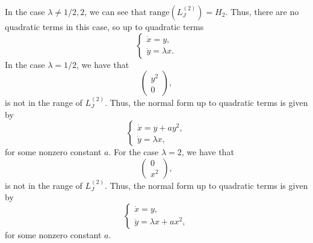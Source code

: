 \documentclass{article}
\begin{document}
In the case $\lambda\neq1/2,2$, we can see that $\text{range}\left(L^{(2)}_J\right)=H_2$. Thus, there are no quadratic terms in this case, so up to quadratic terms
\[
\begin{cases}
	\dot x=y,\\
	\dot y=\lambda x.
\end{cases}
\]
In the case $\lambda=1/2$, we have that 
\[
\begin{pmatrix}
	y^2\\0
\end{pmatrix},
\]
is not in the range of $L^{(2)}_J$. Thus, the normal form up to quadratic terms is given by
\[
\begin{cases}
	\dot x=y+ay^2,\\
	\dot y=\lambda x,
\end{cases}
\]
for some nonzero constant $a$. For the case $\lambda=2$, we have that 
\[
\begin{pmatrix}
	0\\x^2
\end{pmatrix},
\]
is not in the range of $L^{(2)}_J$. Thus, the normal form up to quadratic terms is given by
\[
\begin{cases}
	\dot x=y,\\
	\dot y=\lambda x+ax^2,
\end{cases}
\]
for some nonzero constant $a$.
\end{document}
